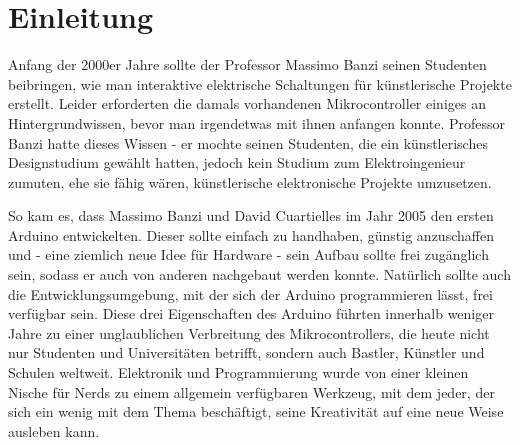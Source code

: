 \chapter{Einleitung}

Anfang der 2000er Jahre sollte der Professor Massimo Banzi seinen Studenten beibringen, wie man interaktive elektrische Schaltungen für künstlerische Projekte erstellt. Leider erforderten die damals vorhandenen Mikrocontroller einiges an Hintergrundwissen, bevor man irgendetwas mit ihnen anfangen konnte. Professor Banzi hatte dieses Wissen - er mochte seinen Studenten, die ein künstlerisches Designstudium gewählt hatten, jedoch kein Studium zum Elektroingenieur zumuten, ehe sie fähig wären, künstlerische elektronische Projekte umzusetzen.

So kam es, dass Massimo Banzi und David Cuartielles im Jahr 2005 den ersten Arduino entwickelten. Dieser sollte einfach zu handhaben, günstig anzuschaffen und - eine ziemlich neue Idee für Hardware - sein Aufbau sollte frei zugänglich sein, sodass er auch von anderen nachgebaut werden konnte. Natürlich sollte auch die Entwicklungsumgebung, mit der sich der Arduino programmieren lässt, frei verfügbar sein. Diese drei Eigenschaften des Arduino führten innerhalb weniger Jahre zu einer unglaublichen Verbreitung des Mikrocontrollers, die heute nicht nur Studenten und Universitäten betrifft, sondern auch Bastler, Künstler und Schulen weltweit. Elektronik und Programmierung wurde von einer kleinen Nische für Nerds zu einem allgemein verfügbaren Werkzeug, mit dem jeder, der sich ein wenig mit dem Thema beschäftigt, seine Kreativität auf eine neue Weise ausleben kann.

